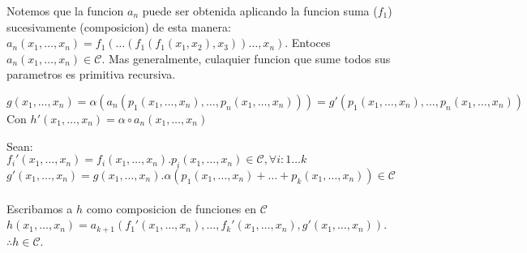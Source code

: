 \documentclass{report}
\begin{document}
\begin{myproof}
	Notemos que la funcion $a_n$  puede ser obtenida aplicando la funcion suma ($f_1$) sucesivamente (composicion) de esta manera:
	$a_n(x_1,\ldots,x_n)=f_1(\ldots(f_1(f_1(x_1,x_2),x_3))\ldots,x_n)$. Entoces $ a_n(x_1,\ldots,x_n)\in \mathcal{C}$. Mas generalmente, culaquier funcion que sume todos sus parametros
	es primitiva recursiva.
\end{myproof}


\begin{myproof}
	$g(x_1, \ldots , x_n) = \alpha(a_n(p_1(x_1, \ldots , x_n), \ldots, p_n(x_1, \ldots , x_n))) = g'(p_1(x_1, \ldots , x_n), \ldots, p_n(x_1, \ldots , x_n))$
	\\Con $h'(x_1, \ldots , x_n) = \alpha \circ a_n (x_1, \ldots , x_n)$
\end{myproof}


\begin{myproof}
	Sean: \\ $f_i'(x_1,\ldots,x_n) = f_i(x_1,\ldots,x_n).p_i(x_1,\ldots,x_n) \in \mathcal{C} , \forall i: 1 \ldots k$
	\\ $g'(x_1,\ldots,x_n) = g(x_1,\ldots,x_n).\alpha(p_1(x_1,\ldots,x_n)+\ldots+p_k(x_1,\ldots,x_n)) \in \mathcal{C}$
	\\\\ Escribamos a $h$ como composicion de funciones en $\mathcal{C}$ \\
	$h(x_1,\ldots,x_n) = a_{k+1}(f_1'(x_1,\ldots,x_n), \ldots,f_k'(x_1,\ldots,x_n), g'(x_1,\ldots,x_n))$. \\$\therefore h \in \mathcal{C}$.


\end{myproof}
\end{document}
